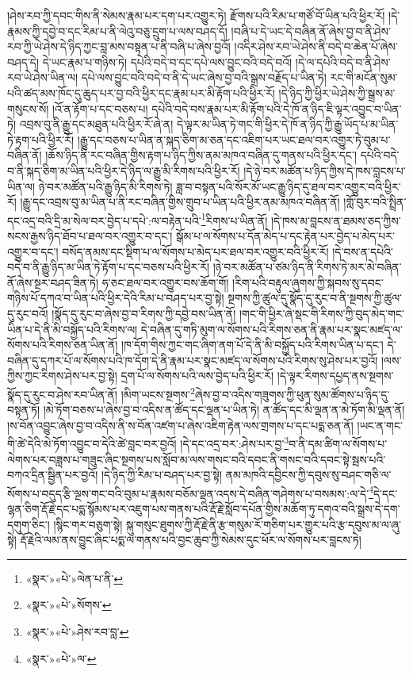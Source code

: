 །ཤེས་རབ་ཀྱི་དབང་གིས་ནི་སེམས་རྣམ་པར་དག་པར་འགྱུར་ཏེ། རྫོགས་པའི་རིམ་པ་གཙོ་བོ་ཡིན་པའི་ཕྱིར་རོ། །དེ་རྣམས་ཀྱི་དབྱེ་བ་དང་རིམ་པ་ནི་ལེའུ་བཅུ་དྲུག་པ་ལས་བཤད་དོ། །བཞི་པ་དེ་ཡང་དེ་བཞིན་ནོ་ཞེས་བྱ་བ་ནི་ཤེས་རབ་ཀྱི་ཡེ་ཤེས་དེ་ཉིད་ཀྱང་བླ་མས་བསྟན་པ་ནི་བཞི་པ་ཞེས་བྱའོ། །འདིར་ཤེས་རབ་ཡེ་ཤེས་ནི་བདེ་བ་ཆེན་པོ་ཞེས་བཤད་དེ། དེ་ཡང་རྣམ་པ་གཉིས་ཏེ། དཔེའི་བདེ་བ་དང་དཔེ་ལས་བྱུང་བའི་བདེ་བའོ། །དེ་ལ་དཔེའི་བདེ་བ་ནི་ཤེས་རབ་ཡེ་ཤེས་ཡིན་ལ། དཔེ་ལས་བྱུང་བའི་བདེ་བ་ནི་དེ་ཡང་ཞེས་བྱ་བའི་སྒྲས་བརྗོད་པ་ཡིན་ཏེ། རང་གི་མངོན་སུམ་པའི་ཚད་མས་ཁོང་དུ་ཆུད་པར་བྱ་བའི་ཕྱིར་དང་རྣམ་པར་མི་རྟོག་པའི་ཕྱིར་རོ། །དེ་ཉིད་ཀྱི་ཕྱིར་ཡེ་ཤེས་ཀྱི་སྒྲས་མ་གསུངས་སོ། །འོ་ན་རྟོག་པ་དང་བཅས་པ། དཔེའི་བདེ་བས་རྣམ་པར་མི་རྟོག་པའི་དེ་ཁོ་ན་ཉིད་ཇི་ལྟར་འབྱུང་བ་ཡིན་ཏེ། འབྲས་བུ་ནི་རྒྱུ་དང་མཐུན་པའི་ཕྱིར་རོ་ཞེ་ན། དེ་ལྟར་མ་ཡིན་ཏེ་གང་གི་ཕྱིར་དེ་ཁོ་ན་ཉིད་ཀྱི་རྒྱུ་ཡོད་པ་མ་ཡིན་ཏེ་རྟག་པའི་ཕྱིར་རོ། །རྒྱུ་དང་བཅས་པ་ཡིན་ན་སྐད་ཅིག་མ་ཅན་དང་འཇིག་པར་ཡང་ཐལ་བར་འགྱུར་ཏེ་བུམ་པ་བཞིན་ནོ། །ཆོས་ཉིད་ནི་རང་བཞིན་གྱིས་རྟག་པ་ཉིད་ཀྱིས་ནམ་མཁའ་བཞིན་དུ་གནས་པའི་ཕྱིར་དང་། དཔེའི་བདེ་བ་ནི་སྐད་ཅིག་མ་ཡིན་པའི་ཕྱིར་དེ་ཉིད་ལ་རྒྱུ་མི་རིགས་པའི་ཕྱིར་རོ། །དེ་ཉེ་བར་མཚོན་པ་ཉིད་ཀྱིས་དེ་ཁས་བླངས་པ་ཡིན་ལ། ཉེ་བར་མཚོན་པའི་རྒྱུ་ཉིད་མི་རིགས་ཏེ། ཟླ་བ་བསྟན་པའི་སོར་མོ་ཡང་རྒྱུ་ཉིད་དུ་ཐལ་བར་འགྱུར་བའི་ཕྱིར་རོ། །རྒྱུ་དང་འབྲས་བུ་མ་ཡིན་པ་ནི་རང་བཞིན་གྱིས་གྲུབ་པ་ཡིན་པའི་ཕྱིར་ནམ་མཁའ་བཞིན་ནོ། །གློ་བུར་བའི་སྤྲིན་དང་འདྲ་བའི་དྲི་མ་སེལ་བར་བྱེད་པ་དཔེ་:ལ་བརྟེན་པའི་\footnote{«སྣར་»«པེ་»ལེན་པ་ནི་}རིགས་པ་ཡིན་ནོ། །དེ་ཁས་མ་བླངས་ན་ཐམས་ཅད་ཀྱིས་སངས་རྒྱས་ཉིད་ཐོབ་པ་ཐལ་བར་འགྱུར་བ་དང་། སྒོམ་པ་ལ་སོགས་པ་དོན་མེད་པ་དང་རྟེན་པར་བྱེད་པ་མེད་པར་འགྱུར་བ་དང་། བསོད་ནམས་དང་སྡིག་པ་ལ་སོགས་པ་མེད་པར་ཐལ་བར་འགྱུར་བའི་ཕྱིར་རོ། །དེ་བས་ན་དཔེའི་བདེ་བ་ནི་རྒྱུ་ཉིད་མ་ཡིན་ཏེ་རྟོག་པ་དང་བཅས་པའི་ཕྱིར་རོ། །ཉེ་བར་མཚོན་པ་ཙམ་ཉིད་ནི་རིགས་ཏེ་མར་མེ་བཞིན་ནོ་ཞེས་སྔར་བཤད་ཟིན་ཏེ། ཧ་ཅང་ཐལ་བར་འགྱུར་བས་ཆོག་གོ། །རིག་པའི་བརྟུལ་ཞུགས་ཀྱི་སྐབས་སུ་དབང་གཉིས་པོ་དཀའ་བ་ཡིན་པའི་ཕྱིར་དེའི་རིམ་པ་བཤད་པར་བྱ་སྟེ། སྔགས་ཀྱི་ཚུལ་དུ་སྣོད་དུ་རུང་བ་ནི་སྔགས་ཀྱི་ཚུལ་དུ་རུང་བའོ། །སྣོད་དུ་རུང་བ་ཞེས་བྱ་བ་རིགས་ཀྱི་དབྱེ་བས་ཡིན་ནོ། །གང་གི་ཕྱིར་ཞེ་སྡང་གི་རིགས་ཀྱི་བུད་མེད་གང་ཡིན་པ་དེ་ནི་མི་བསྐྱོད་པའི་རིགས་ལ། དེ་བཞིན་དུ་གཏི་མུག་ལ་སོགས་པའི་རིགས་ཅན་ནི་རྣམ་པར་སྣང་མཛད་ལ་སོགས་པའི་རིགས་ཅན་ཡིན་ནོ། །ཁ་དོག་གིས་ཀྱང་གང་ཞིག་ནག་པོ་དེ་ནི་མི་བསྐྱོད་པའི་རིགས་ཡིན་པ་དང་། དེ་བཞིན་དུ་དཀར་པོ་ལ་སོགས་པའི་ཁ་དོག་དེ་ནི་རྣམ་པར་སྣང་མཛད་ལ་སོགས་པའི་རིགས་སུ་ཤེས་པར་བྱའོ། །ལས་ཀྱིས་ཀྱང་རིགས་ཤེས་པར་བྱ་སྟེ། དྲག་པོ་ལ་སོགས་པའི་ལས་བྱེད་པའི་ཕྱིར་རོ། །དེ་ལྟར་རིགས་དཔྱད་ནས་སྔགས་སྣོད་དུ་རུང་བ་ཤེས་རབ་ཡིན་ནོ། །མིག་ཡངས་སྔགས་\footnote{«སྣར་»«པེ་»སོགས་}ཞེས་བྱ་བ་འདིས་གཟུགས་ཀྱི་ཕུན་སུམ་ཚོགས་པ་ཉིད་དུ་བསྟན་ཏོ། །མེ་ཏོག་བཅས་པ་ཞེས་བྱ་བ་འདིས་ན་ཚོད་དང་ལྡན་པ་ཡིན་ཏེ། ན་ཚོད་དང་མི་ལྡན་ན་མེ་ཏོག་མི་ལྡན་ནོ། །ས་བོན་འབྱུང་ཞེས་བྱ་བ་འདིས་ནི་ས་བོན་འཛག་པ་ཞེས་འཇིག་རྟེན་ལས་གྲགས་པ་དང་པདྨ་ཅན་ནོ། །ཡང་ན་གང་གི་ཚེ་དེའི་མེ་ཏོག་འབྱུང་བ་དེའི་ཚེ་བླང་བར་བྱའོ། །དེ་དང་འདྲ་བར་:ཤེས་པར་བྱ་\footnote{«སྣར་»«པེ་»ཤེས་རབ་བླ་}བ་ནི་དམ་ཚིག་ལ་སོགས་པ་ལེགས་པར་བཟླས་པ་གཟུང་ཞིང་སྔགས་པས་སློབ་མ་ལས་གསང་བའི་དབང་ནི་གསང་བའི་དབང་སྟེ་སྦས་པའི་བཀའ་དྲིན་སྦྱིན་པར་བྱའོ། །དེ་ཉིད་ཀྱི་རིམ་པ་བཤད་པར་བྱ་སྟེ། ནམ་མཁའི་དབྱིངས་ཀྱི་དབུས་སུ་བཤང་གཅི་ལ་སོགས་པ་བདུད་རྩི་ལྔས་གང་བའི་བུམ་པ་རྣམས་བཅོམ་ལྡན་འདས་དེ་བཞིན་གཤེགས་པ་བསམས་:ལ་དེ་\footnote{«སྣར་»«པེ་»ལ་}དེ་དང་ལྷན་ཅིག་རྡོ་རྗེ་དང་པདྨ་སྙོམས་པར་འཇུག་པས་གནས་པའི་རྡོ་རྗེ་སློབ་དཔོན་གྱིས་མཆོག་ཏུ་དགའ་བའི་སྒྲས་དེ་དག་དགུག་ཅིང་། །སྙིང་གར་བཅུག་སྟེ། སྐུ་གསུང་ཐུགས་ཀྱི་རྡོ་རྗེ་ནི་རྩ་གསུམ་རོ་གཅིག་པར་གྱུར་པའི་རྩ་དབུས་མ་ལ་ཞུ་སྟེ། རྡོ་རྗེའི་ལམ་ནས་བྱུང་ཞིང་པདྨ་ལ་གནས་པའི་བྱང་ཆུབ་ཀྱི་སེམས་དུང་ཕོར་ལ་སོགས་པར་བླངས་ཏེ། 